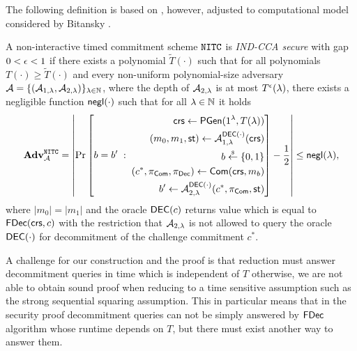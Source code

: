 The following definition is based on \cite{TCC:KatLosXu20}, however, adjusted to computational model considered by Bitansky \etal \cite{ITCS:BGJPVW16}. 
\begin{definition}
\label{def:nitc_cca}
A non-interactive timed commitment scheme $\mathtt{NITC}$ is \emph{IND-CCA secure} with gap $0 < \epsilon < 1$ if there exists a polynomial $\tilde{T}(\cdot)$ such that for all polynomials $T(\cdot) \geq \tilde{T}(\cdot)$ and every non-uniform polynomial-size adversary $\mathcal{A} = \{(\mathcal{A}_{1,\lambda}, \mathcal{A}_{2, \lambda})\}_{\lambda \in \mathbb{N}}$, where the depth of $\mathcal{A}_{2, \lambda}$ is at most $T^{\epsilon}(\lambda)$, there exists a negligible function $\mathsf{negl}(\cdot)$ such that for all $\lambda \in \mathbb{N}$ it holds 
\[ \mathbf{Adv}^{\mathtt{NITC}}_{\mathcal{A}} = 
\left| \Pr\left[ 
    b = b'
    \;:\;
    \begin{aligned}
    \mathsf{crs} \leftarrow \mathsf{PGen}(1{^{\lambda}}, T(\lambda)) \\
      (m_0, m_1, \mathsf{st}) \leftarrow \mathcal{A}_{1,\lambda}^{\mathsf{DEC}(\cdot)}(\mathsf{crs}) \\
      b \stackrel{{\scriptscriptstyle\$}}{\leftarrow} \{0,1\}\\
      (c^*, \pi_{\mathsf{Com}}, \pi_{\mathsf{Dec}}) \leftarrow \mathsf{Com}(\mathsf{crs}, m_b) \\
      b' \leftarrow \mathcal{A}_{2,\lambda}^{\mathsf{DEC}(\cdot)}(c^*, \pi_{\mathsf{Com}}, \mathsf{st})
    \end{aligned}
    \right] -  \frac{1}{2} \right|
\leq \mathsf{negl}(\lambda),  
\]
where $|m_0|=|m_1|$ and the oracle ${\mathsf{DEC}(c)}$ returns value which is equal to $\mathsf{FDec}(\mathsf{crs}, c)$ with the restriction that $\mathcal{A}_{2, \lambda}$ is not allowed to query the oracle $\mathsf{DEC}(\cdot)$ for decommitment of the challenge commitment $c^*$. %
\end{definition}

A challenge for our construction and the proof is that reduction must answer decommitment queries in time which is independent of $T$ otherwise, we are not able to obtain sound proof when reducing to a time sensitive assumption such as the strong sequential squaring assumption. This in particular means that in the security proof decommitment queries can not be simply answered by $\mathsf{FDec}$ algorithm whose runtime depends on $T$, but there must exist another way to answer them. 


